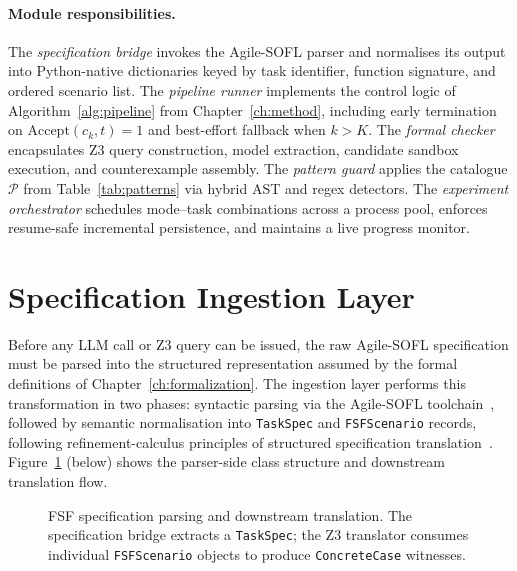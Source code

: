 \paragraph{Module responsibilities.}
The \emph{specification bridge} invokes the Agile-SOFL parser and normalises
its output into Python-native dictionaries keyed by task identifier, function
signature, and ordered scenario list.  The \emph{pipeline runner} implements
the control logic of Algorithm~\ref{alg:pipeline} from
Chapter~\ref{ch:method}, including early termination on
$\mathrm{Accept}(c_k,t)=1$ and best-effort fallback when $k > K$.
The \emph{formal checker} encapsulates Z3 query construction, model
extraction, candidate sandbox execution, and counterexample assembly.
The \emph{pattern guard} applies the catalogue $\mathcal{P}$ from
Table~\ref{tab:patterns} via hybrid AST and regex detectors.
The \emph{experiment orchestrator} schedules mode--task combinations across
a process pool, enforces resume-safe incremental persistence, and maintains a
live progress monitor.

\section{Specification Ingestion Layer}
\label{sec:impl:ingestion}

Before any LLM call or Z3 query can be issued, the raw Agile-SOFL
specification must be parsed into the structured representation assumed by
the formal definitions of Chapter~\ref{ch:formalization}.  The ingestion
layer performs this transformation in two phases: syntactic parsing via the
Agile-SOFL toolchain~\citep{li2022agilesofl,liu2014sofl}, followed by
semantic normalisation into \texttt{TaskSpec} and \texttt{FSFScenario}
records, following refinement-calculus principles of structured specification
translation~\citep{back1998refinement}.  Figure~\ref{fig:fsf-parser-class}
(below) shows the parser-side class structure and downstream translation flow.

\begin{figure}[t]
  \centering
  \caption{FSF specification parsing and downstream translation.  The
           specification bridge extracts a \texttt{TaskSpec}; the Z3
           translator consumes individual \texttt{FSFScenario} objects to
           produce \texttt{ConcreteCase} witnesses.}
  \label{fig:fsf-parser-class}
\end{figure}

